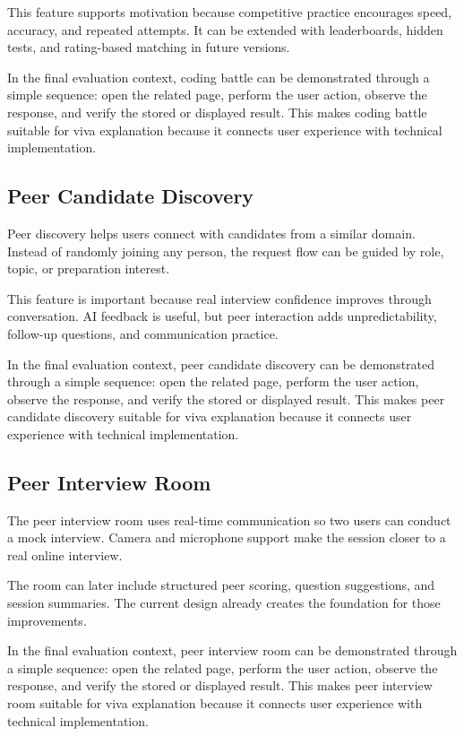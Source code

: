 \documentclass[12pt,a4paper]{report}
\begin{document}
This feature supports motivation because competitive practice encourages speed, accuracy, and repeated attempts. It can be extended with leaderboards, hidden tests, and rating-based matching in future versions.

In the final evaluation context, coding battle can be demonstrated through a simple sequence: open the related page, perform the user action, observe the response, and verify the stored or displayed result. This makes coding battle suitable for viva explanation because it connects user experience with technical implementation.

\subsection{Peer Candidate Discovery}

Peer discovery helps users connect with candidates from a similar domain. Instead of randomly joining any person, the request flow can be guided by role, topic, or preparation interest.

This feature is important because real interview confidence improves through conversation. AI feedback is useful, but peer interaction adds unpredictability, follow-up questions, and communication practice.

In the final evaluation context, peer candidate discovery can be demonstrated through a simple sequence: open the related page, perform the user action, observe the response, and verify the stored or displayed result. This makes peer candidate discovery suitable for viva explanation because it connects user experience with technical implementation.

\subsection{Peer Interview Room}

The peer interview room uses real-time communication so two users can conduct a mock interview. Camera and microphone support make the session closer to a real online interview.

The room can later include structured peer scoring, question suggestions, and session summaries. The current design already creates the foundation for those improvements.

In the final evaluation context, peer interview room can be demonstrated through a simple sequence: open the related page, perform the user action, observe the response, and verify the stored or displayed result. This makes peer interview room suitable for viva explanation because it connects user experience with technical implementation.
\end{document}
